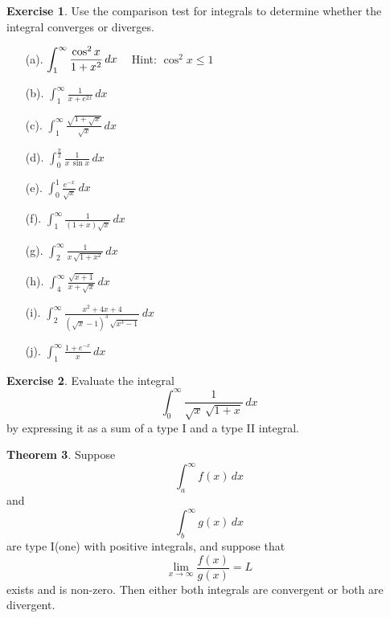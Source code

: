 \documentclass[12pt,a4paper]{report}
\theoremstyle{definition}
\newtheorem{thm}{Theorem}[section]
\newtheorem{exe}[thm]{Exercise}
\theoremstyle{plain}
\begin{document}
\begin{exe}
Use the comparison test for integrals to determine whether the integral converges or diverges.
\begin{multicols}{2}
\begin{enumerate}
\item[(a).] $\displaystyle{\int_1^{\infty} \frac{\cos^2 x}{1 + x^2}}\, dx\hspace{0.3cm}$ Hint: $\cos^2 x \leq 1$
\item[(b).] $\displaystyle{\int_1^{\infty} \frac{1}{x + e^{2x}}\, dx}$
\item[(c).] $\displaystyle{\int_1^{\infty}\frac{\sqrt{1 + \sqrt{x}}}{\sqrt{x}}}\, dx$
\item[(d).] $\displaystyle{\int_0^{\frac{\pi}{2}} \frac{1}{x\,\sin x}}\, dx$
\item[(e).] $\displaystyle{\int_0^1\frac{e^{-x}}{\sqrt{x}}}\, dx$
\item[(f).] $\displaystyle{\int_1^{\infty}\frac{1}{(1 + x)\sqrt{x}}}\, dx$
\item[(g).] $\displaystyle{\int_2^{\infty} \frac{1}{x\, \sqrt{1 + x^2}}}\, dx$
\item[(h).] $\displaystyle{\int_4^{\infty} \frac{\sqrt{x + 1}}{x + \sqrt{x}}}\, dx$
\item[(i).] $\displaystyle{\int_2^{\infty} \frac{x^2 + 4x + 4}{(\sqrt{x} - 1)^3\, \sqrt{x^3 - 1}}}\, dx$
\item[(j).] $\displaystyle{\int_1^{\infty} \frac{1 + e^{-x}}{x}}\, dx$
\end{enumerate}
\end{multicols}
\end{exe}









\begin{exe}
Evaluate the integral $$\int_0^{\infty} \frac{1}{\sqrt{x}\, \sqrt{1 + x}}\, dx$$ by expressing it as a sum of a type I and a type II integral.
\end{exe}








\begin{thm}
Suppose $$\int_a^{\infty} f(x)\, dx$$ and $$\int_b^{\infty} g(x)\, dx$$ are type I(one) with positive integrals, and suppose that $$\lim_{x\rightarrow \infty} \frac{f(x)}{g(x)} = L$$ exists and is non-zero.  Then either both integrals are convergent or both are divergent.
\end{thm}
\end{document}
